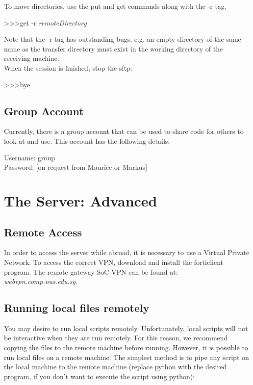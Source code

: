 To move directories, use the put and get commands along with the -r tag.\\

\begin{mdframed}
\textgreater\textgreater\textgreater \quad get -r \textit{remoteDirectory}
\end{mdframed}

Note that the -r tag has outstanding bugs, e.g. an empty directory of the same name as the transfer directory must exist in the working directory of the receiving machine.\\

When the session is finished, stop the sftp:\\

\begin{mdframed}
\textgreater\textgreater\textgreater \quad bye
\end{mdframed}

\section{Group Account}
Currently, there is a group account that can be used to share code for others to look at and use. This account has the following details:
\begin{mdframed}
Username: group\\
Password: [on request from Maurice or Markus]
\end{mdframed}

\chapter{The Server: Advanced}

\section{Remote Access}

In order to access the server while abroad, it is necessary to use a Virtual Private Network. To access the correct VPN, download and install the forticlient program. The remote gateway SoC VPN can be found at: \textit{webvpn.comp.nus.edu.sg}.\\

\section{Running local files remotely}

You may desire to run local scripts remotely. Unfortunately, local scripts will not be interactive when they are run remotely. For this reason, we recommend copying the files to the remote machine before running. However, it is possible to run local files on a remote machine. The simplest method is to pipe any script on the local machine to the remote machine (replace python with the desired program, if you don't want to execute the script using python):

